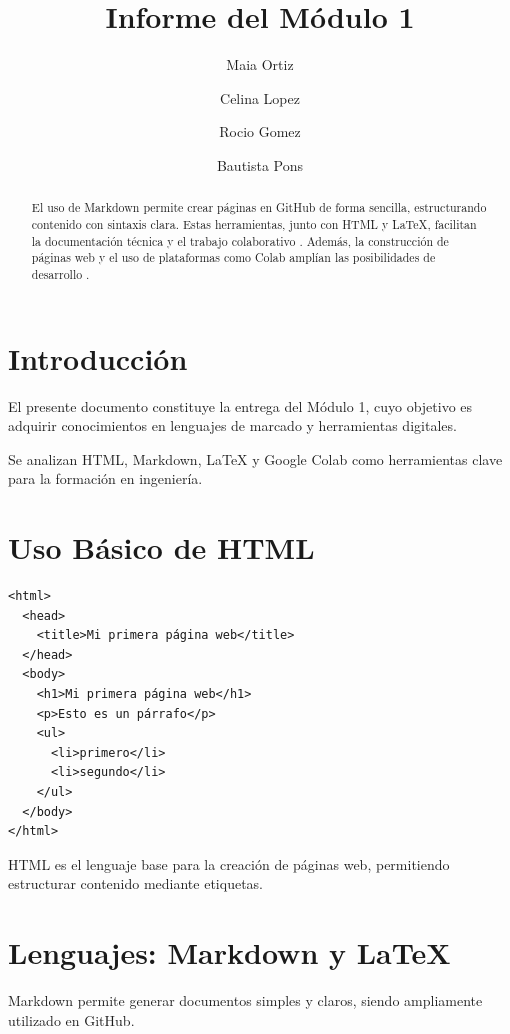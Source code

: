 \documentclass[runningheads]{llncs}
\begin{document}
\title{Informe del Módulo 1}

\author{Maia Ortiz \and Celina Lopez \and Rocio Gomez \and Bautista Pons}

\maketitle

\begin{abstract}
El uso de Markdown permite crear páginas en GitHub de forma sencilla, estructurando contenido con sintaxis clara. Estas herramientas, junto con HTML y LaTeX, facilitan la documentación técnica y el trabajo colaborativo \cite{lopez2003latex}. Además, la construcción de páginas web y el uso de plataformas como Colab amplían las posibilidades de desarrollo \cite{sepulcre2024uso}.
\end{abstract}

\section{Introducción}

El presente documento constituye la entrega del Módulo 1, cuyo objetivo es adquirir conocimientos en lenguajes de marcado y herramientas digitales.

Se analizan HTML, Markdown, LaTeX y Google Colab como herramientas clave para la formación en ingeniería.

\section{Uso Básico de HTML}

\begin{lstlisting}
<html>
  <head>
    <title>Mi primera página web</title>
  </head>
  <body>
    <h1>Mi primera página web</h1>
    <p>Esto es un párrafo</p>
    <ul>
      <li>primero</li>
      <li>segundo</li>
    </ul>
  </body>
</html>
\end{lstlisting}

HTML es el lenguaje base para la creación de páginas web, permitiendo estructurar contenido mediante etiquetas.

\section{Lenguajes: Markdown y LaTeX}

Markdown permite generar documentos simples y claros, siendo ampliamente utilizado en GitHub.
\end{document}
